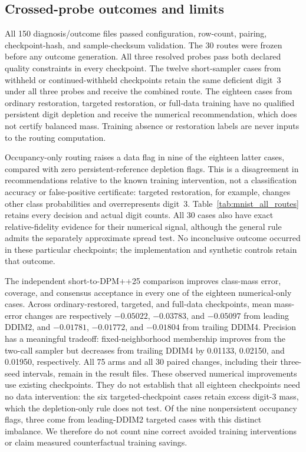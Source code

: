 \subsection{Crossed-probe outcomes and limits}
All 150 diagnosis/outcome files passed configuration, row-count, pairing,
checkpoint-hash, and sample-checksum validation. The 30 routes were frozen
before any outcome generation. All three resolved probes pass both declared
quality constraints in every checkpoint. The twelve short-sampler cases from
withheld or continued-withheld checkpoints retain the same deficient digit~3
under all three probes and receive the combined route. The eighteen cases from
ordinary restoration, targeted restoration, or full-data training have no
qualified persistent digit depletion and receive the numerical recommendation, which does not certify balanced mass. Training
absence or restoration labels are never inputs to the routing computation.

Occupancy-only routing raises a data flag in nine of the eighteen latter
cases, compared with zero persistent-reference depletion flags. This is a disagreement
in recommendations relative to the known training intervention, not a
classification accuracy or false-positive certificate: targeted restoration,
for example, changes other class probabilities and overrepresents digit~3.
Table~\ref{tab:mnist_all_routes} retains every decision and actual digit counts.
All 30 cases also have exact relative-fidelity evidence for their numerical
signal, although the general rule admits the separately approximate spread
test. No inconclusive outcome occurred in these particular checkpoints;
the implementation and synthetic controls retain that outcome.

The independent short-to-DPM++25 comparison improves class-mass error,
coverage, and consensus acceptance in every one of the eighteen
numerical-only cases. Across ordinary-restored, targeted, and full-data
checkpoints, mean mass-error changes are respectively $-0.05022$, $-0.03783$,
and $-0.05097$ from leading DDIM2, and $-0.01781$, $-0.01772$, and $-0.01804$
from trailing DDIM4. Precision has a meaningful tradeoff: fixed-neighborhood
membership improves from the two-call sampler but decreases from trailing
DDIM4 by 0.01133, 0.02150, and 0.01950, respectively. All 75 arms and all
30 paired changes, including their three-seed intervals, remain in the result
files. These observed numerical improvements use existing checkpoints. They do not
establish that all eighteen checkpoints need no data intervention: the six
targeted-checkpoint cases retain excess digit-3 mass, which the depletion-only
rule does not test. Of the nine nonpersistent occupancy flags, three come
from leading-DDIM2 targeted cases with this distinct imbalance. We therefore
do not count nine correct avoided training interventions or claim measured
counterfactual training savings.

